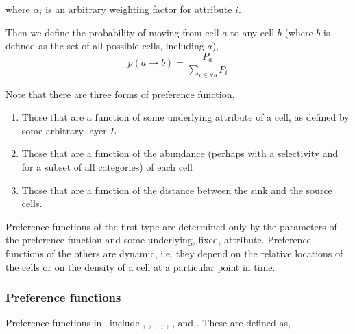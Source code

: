 where $\alpha_i$ is an arbitrary weighting factor for attribute $i$.

Then we define the probability of moving from cell $a$ to any cell $b$ (where $b$ is defined as the set of all possible cells, including $a$),
\begin{equation}
  p(a\rightarrow b) = \frac{P_a}{\sum\limits_{i \in \forall b} P_i}
\end{equation}

Note that there are three forms of preference function,
\begin{enumerate}
\item Those that are a function of some underlying attribute of a cell, as defined by some arbitrary layer $L$
\item Those that are a function of the abundance (perhaps with a selectivity and for a subset of all categories) of each cell
\item Those that are a function of the distance between the sink and the source cells. 
\end{enumerate} 

Preference functions of the first type are determined only by the parameters of the preference function and some underlying, fixed, attribute. Preference functions of the others are dynamic, i.e. they depend on the relative locations of the cells or on the density of a cell at a particular point in time.

\subsubsection*{Preference functions}

Preference functions in \SPM\ include , , , , , , and . These are defined as,


